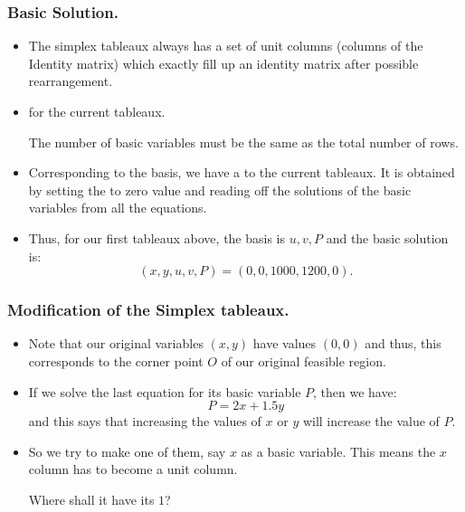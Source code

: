 

\begin{frame}%
  \frametitle{Basic Solution.}
  \begin{itemize}%
 
\item 
The simplex tableaux always has a set of unit columns (columns of the
Identity matrix) which exactly fill up an identity matrix after possible
rearrangement.

\item
{} for the current tableaux.

The number of basic variables must be the same as the total number of rows.

\item Corresponding to the basis, we have a  to the
current tableaux. It is obtained by setting the  to zero value and reading off the solutions of the basic
variables from all the equations.

\item Thus, for our first tableaux above, the basis is $u,v,P$ and the
basic solution is:
$$(x,y,u,v,P)=(0,0,1000,1200,0).$$

\end{itemize}
\end{frame}


\begin{frame}%
  \frametitle{Modification of the Simplex tableaux.}
  \begin{itemize}%
 
\item Note that our original variables $(x,y)$ have values $(0,0)$ and
thus, this corresponds to the corner point $O$ of our original feasible
region.

\item If we solve the last equation for its basic variable $P$, then we
have:
$$P=2x+1.5y$$and this says that increasing the values of $x$ or $y$ will
increase the value of $P$.

\item So we try to make one of them, say $x$ as a basic variable. This
means the $x$ column has to become a unit column.

Where shall it have its $1$?

\end{itemize}
\end{frame}

